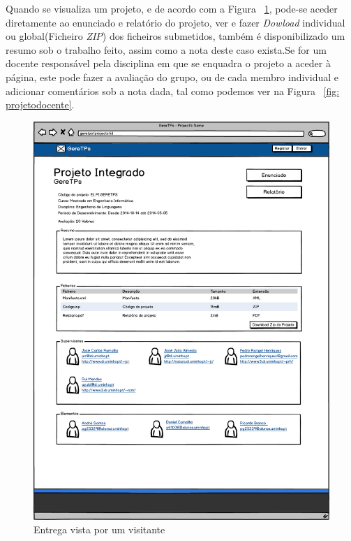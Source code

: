 Quando se visualiza um projeto, e de acordo com a Figura ~\ref{fig: projetoaluno}, pode-se aceder diretamente ao enunciado e relatório do projeto, ver e fazer \emph{Dowload} individual ou global(Ficheiro \emph{ZIP}) dos ficheiros submetidos, também é disponibilizado um resumo sob o trabalho feito, assim como a nota deste caso exista.Se for um docente responsável pela disciplina em que se enquadra o projeto a aceder à página, este pode fazer a avaliação do grupo, ou de cada membro individual e adicionar comentários sob a nota dada, tal como podemos ver na Figura ~\ref{fig: projetodocente}.\\

\begin{figure}[H]
        \centering
        \includegraphics[width=1\textwidth]{images/prototipos/mockups/projetovisitante.png}
         \caption{Entrega vista por um visitante}
         \label{fig: projetoaluno}
\end{figure}


